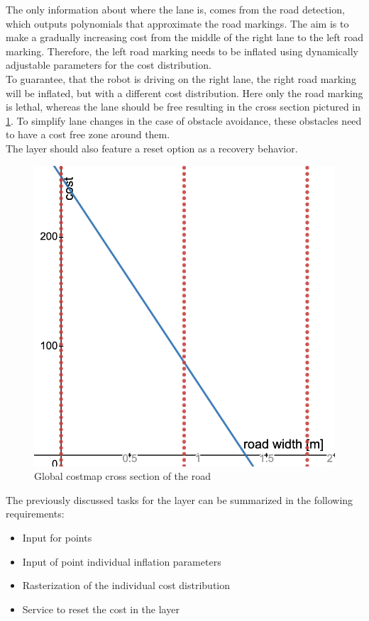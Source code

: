 The only information about where the lane is, comes from the road detection, which outputs polynomials that approximate the road markings. The aim is to make a gradually increasing cost from the middle of the right lane to the left road marking. Therefore, the left road marking needs to be inflated using dynamically adjustable parameters for the cost distribution.\\


To guarantee, that the robot is driving on the right lane, the right road marking will be inflated, but with a different cost distribution. Here only the road marking is lethal, whereas the lane should be free resulting in the cross section pictured in \ref{globalcostdistro}. To simplify lane changes in the case of obstacle avoidance, these obstacles need to have a cost free zone around them.\\

The layer should also feature a reset option as a recovery behavior.

\begin{figure}[H]
	\centering
	\includegraphics[width=.8\textwidth]{Pictures/global stage cost distro}
	\caption{Global costmap cross section of the road}
	\label{globalcostdistro}
\end{figure}



The previously discussed tasks for the layer can be summarized in the following requirements:

\begin{itemize}
	\item Input for points
	\item Input of point individual inflation parameters
	\item Rasterization of the individual cost distribution
	\item Service to reset the cost in the layer
\end{itemize}



